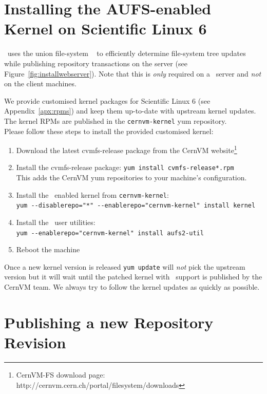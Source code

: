 \section{Installing the AUFS-enabled Kernel on Scientific Linux 6}
\label{sct:customkernelinstall}
\cvmfs\ uses the union file-system \aufs\ \cite{aufs} to efficiently determine file-system tree updates while publishing repository transactions on the server (see Figure~\ref{fig:installwebserver}).
Note that this is \emph{only} required on a \cvmfs\ server and \emph{not} on the client machines.

We provide customised kernel packages for Scientific Linux 6 (see Appendix~\ref{apx:rpms}) and keep them up-to-date with upstream kernel updates.
The kernel RPMs are published in the \texttt{cernvm-kernel} yum repository. \\

\noindent Please follow these steps to install the provided customised kernel:
\begin{enumerate}
\item Download the latest cvmfs-release package from the CernVM website\footnote{CernVM-FS download page: http://cernvm.cern.ch/portal/filesystem/downloads}
\item Install the cvmfs-release package: \texttt{yum install cvmfs-release*.rpm} \\
This adds the CernVM yum repositories to your machine's configuration.
\item Install the \aufs\ enabled kernel from \texttt{cernvm-kernel}: \\
\texttt{yum -\--disablerepo="*" -\--enablerepo="cernvm-kernel" install kernel}
\item Install the \aufs\ user utilities: \\
\texttt{yum -\--enablerepo="cernvm-kernel" install aufs2-util}
\item Reboot the machine
\end{enumerate}

Once a new kernel version is released \texttt{yum update} will \emph{not} pick the upstream version but it will wait until the patched kernel with \aufs\ support is published by the CernVM team.
We always try to follow the kernel updates as quickly as possible.

\section{Publishing a new Repository Revision}
\label{sct:repoupdate}

